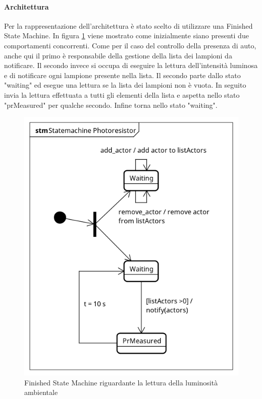\paragraph{Architettura}
Per la rappresentazione dell'architettura è stato scelto di utilizzare una Finished State Machine.
In figura \ref{FSM PR} viene mostrato come inizialmente siano presenti due comportamenti concorrenti.
Come per il caso del controllo della presenza di auto, anche qui il primo è responsabile della gestione della lista dei lampioni da notificare.
Il secondo invece si occupa di eseguire la lettura dell'intensità luminosa e di notificare ogni lampione presente nella lista.
Il secondo parte dallo stato "waiting" ed esegue una lettura se la lista dei lampioni non è vuota.
In seguito invia la lettura effettuata a tutti gli elementi della lista e aspetta nello stato "prMeasured" per qualche secondo.
Infine torna nello stato "waiting".
\begin{figure}[tbp]
	\centering
	\includegraphics[scale=.8]{figure/Statemachine_Photoresistor.png}
	\caption{Finished State Machine riguardante la lettura della luminosità ambientale \label{FSM PR}}
\end{figure}

